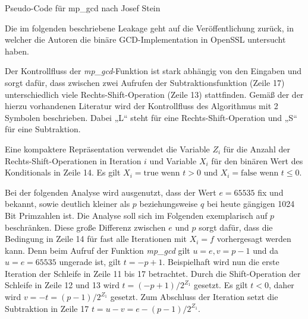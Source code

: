 \begin{algorithm}[h]
\DontPrintSemicolon
\caption{Pseudo-Code für mp_gcd nach Josef Stein}
\label{alg:mp_gcd}

\end{algorithm}

Die im folgenden beschriebene Leakage geht auf die Veröffentlichung \cite{RSAKeyGeneration2} zurück, in welcher die Autoren die binäre GCD-Implementation in OpenSSL untersucht haben.

Der Kontrollfluss der \textit{mp_gcd}-Funktion ist stark abhängig von den Eingaben und sorgt dafür, dass zwischen zwei Aufrufen der Subtraktionsfunktion (Zeile 17) unterschiedlich viele Rechts-Shift-Operation (Zeile 13) stattfinden.
Gemäß der der hierzu vorhandenen Literatur \cite{ShiftSubtractionDescription} wird der Kontrollfluss des Algorithmus mit 2 Symbolen beschrieben.
Dabei „L“ steht für eine Rechts-Shift-Operation und „S“ für eine Subtraktion.

Eine kompaktere Repräsentation verwendet die Variable $Z_i$ für die Anzahl der Rechts-Shift-Operationen in Iteration $i$ und
Variable $X_i$ für den binären Wert des Konditionals in Zeile 14. 
Es gilt $X_i=\text{true}$ wenn $t>0$ und $X_i = \text{false}$ wenn $t \leq 0$.

Bei der folgenden Analyse wird ausgenutzt, dass der Wert $e=65535$ fix und bekannt, sowie deutlich kleiner als $p$ beziehungsweise $q$ bei heute gängigen 1024 Bit Primzahlen ist.
Die Analyse soll sich im Folgenden exemplarisch auf $p$ beschränken.
Diese große Differenz zwischen $e$ und $p$ sorgt dafür, dass die Bedingung in Zeile 14 für fast alle Iterationen mit $X_i = f$ vorhergesagt werden kann.
Denn beim Aufruf der Funktion \textit{mp_gcd} gilt $u=e, v=p-1$ und da $u=e=65535$ ungerade ist, gilt $t=-p+1$.
Beispielhaft wird nun die erste Iteration der Schleife in Zeile 11 bis 17 betrachtet.
Durch die Shift-Operation der Schleife in Zeile 12 und 13 wird $t=(-p+1)/2^{Z_1}$ gesetzt.
Es gilt $t<0$, daher wird $v=-t=(p-1)/2^{Z_1}$ gesetzt. 
Zum Abschluss der Iteration setzt die Subtraktion in Zeile 17 $t=u-v=e-(p-1)/2^{Z_1}$.

